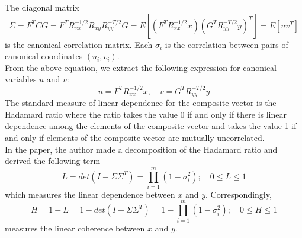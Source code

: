 \documentclass[12pt]{report} %
\begin{document}
The diagonal matrix
\begin{equation}
\Sigma=F^TCG=F^TR_{xx}^{-1/2}R_{xy}R_{yy}^{-T/2}G=E[(F^TR_{xx}^{-1/2}x)(G^TR_{yy}^{-T/2}y)^T]=E[uv^T]
\end{equation}
is the canonical correlation matrix. Each $\sigma_{i}$ is the correlation between pairs of canonical coordinates $(u_{i},v_{i})$. \\
From the above equation, we extract the following expression for canonical variables $u$ and $v$:
\begin{equation}
u=F^TR_{xx}^{-1/2}x,\quad v=G^TR_{yy}^{-T/2}y
\end{equation}
The standard measure of linear dependence for the composite vector is the Hadamard ratio where the ratio takes the value 0 if and only if there is linear dependence among the elements of the composite vector and takes the value 1 if and only if elements of the composite vector are mutually uncorrelated. \\
In the paper, the author made a decomposition of the Hadamard ratio and derived the following term
\begin{equation}
L=det(I-\Sigma\Sigma^T)=\prod_{i=1}^{m}(1-\sigma_{i}^2);\quad 0\leq L\leq 1
\end{equation}
which measures the linear dependence between $x$ and $y$. Correspondingly,
\begin{equation}
H=1-L=1-det(I-\Sigma\Sigma^T)=1-\prod_{i=1}^{m}(1-\sigma_{i}^2);\quad 0\leq H\leq 1
\end{equation}
measures the linear coherence between $x$ and $y$.
\end{document}
